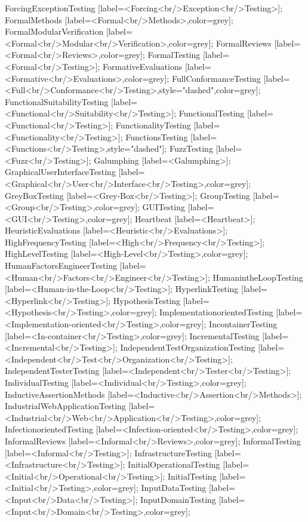 \documentclass{article}
\begin{document}
{ForcingExceptionTesting [label=<Forcing<br/>Exception<br/>Testing>];
FormalMethods [label=<Formal<br/>Methods>,color=grey];
FormalModularVerification [label=<Formal<br/>Modular<br/>Verification>,color=grey];
FormalReviews [label=<Formal<br/>Reviews>,color=grey];
FormalTesting [label=<Formal<br/>Testing>];
FormativeEvaluations [label=<Formative<br/>Evaluations>,color=grey];
FullConformanceTesting [label=<Full<br/>Conformance<br/>Testing>,style="dashed",color=grey];
FunctionalSuitabilityTesting [label=<Functional<br/>Suitability<br/>Testing>];
FunctionalTesting [label=<Functional<br/>Testing>];
FunctionalityTesting [label=<Functionality<br/>Testing>];
FunctionsTesting [label=<Functions<br/>Testing>,style="dashed"];
FuzzTesting [label=<Fuzz<br/>Testing>];
Galumphing [label=<Galumphing>];
GraphicalUserInterfaceTesting [label=<Graphical<br/>User<br/>Interface<br/>Testing>,color=grey];
GreyBoxTesting [label=<Grey-Box<br/>Testing>];
GroupTesting [label=<Group<br/>Testing>,color=grey];
GUITesting [label=<GUI<br/>Testing>,color=grey];
Heartbeat [label=<Heartbeat>];
HeuristicEvaluations [label=<Heuristic<br/>Evaluations>];
HighFrequencyTesting [label=<High<br/>Frequency<br/>Testing>];
HighLevelTesting [label=<High-Level<br/>Testing>,color=grey];
HumanFactorsEngineerTesting [label=<Human<br/>Factors<br/>Engineer<br/>Testing>];
HumanintheLoopTesting [label=<Human-in-the-Loop<br/>Testing>];
HyperlinkTesting [label=<Hyperlink<br/>Testing>];
HypothesisTesting [label=<Hypothesis<br/>Testing>,color=grey];
ImplementationorientedTesting [label=<Implementation-oriented<br/>Testing>,color=grey];
IncontainerTesting [label=<In-container<br/>Testing>,color=grey];
IncrementalTesting [label=<Incremental<br/>Testing>];
IndependentTestOrganizationTesting [label=<Independent<br/>Test<br/>Organization<br/>Testing>];
IndependentTesterTesting [label=<Independent<br/>Tester<br/>Testing>];
IndividualTesting [label=<Individual<br/>Testing>,color=grey];
InductiveAssertionMethods [label=<Inductive<br/>Assertion<br/>Methods>];
IndustrialWebApplicationTesting [label=<Industrial<br/>Web<br/>Application<br/>Testing>,color=grey];
InfectionorientedTesting [label=<Infection-oriented<br/>Testing>,color=grey];
InformalReviews [label=<Informal<br/>Reviews>,color=grey];
InformalTesting [label=<Informal<br/>Testing>];
InfrastructureTesting [label=<Infrastructure<br/>Testing>];
InitialOperationalTesting [label=<Initial<br/>Operational<br/>Testing>];
InitialTesting [label=<Initial<br/>Testing>,color=grey];
InputDataTesting [label=<Input<br/>Data<br/>Testing>];
InputDomainTesting [label=<Input<br/>Domain<br/>Testing>,color=grey];
}
\end{document}

